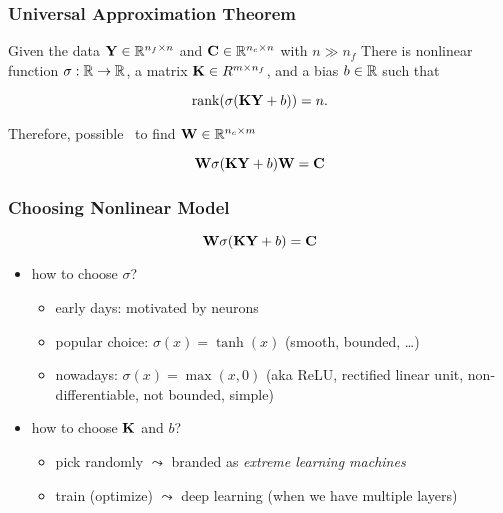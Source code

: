 \documentclass[12pt,fleqn,handout]{beamer}
\begin{document}
\begin{frame}[fragile]\frametitle{Universal Approximation Theorem}

Given the data ${\bf Y} \in \mathbb{R}^{n_f \times n}$ and ${\bf C} \in \mathbb{R}^{n_c \times n}$
with $n\gg n_f$
There is nonlinear function $\sigma:\mathbb{R} \to \mathbb{R}$, a matrix ${\bf K} \in R^{m \times n_f}$, and a bias $b \in \mathbb{R}$ such that

$$
 {\rm rank}(\sigma({\bf K} {\bf Y} + b)) = n.
$$

\bigskip
\pause
Therefore, possible~\cite{Cybenko1989,HornikEtAl1989} to find ${{\bf W}}\in\mathbb{R}^{n_c\times m}$

$${\bf W} \sigma( {\bf K} {\bf Y} +b) {{\bf W}}= {\bf C} $$

\end{frame}


\begin{frame}[fragile]\frametitle{Choosing Nonlinear Model}

$$ {\bf W}  \sigma({\bf K} {\bf Y}+b)= {\bf C} $$
\begin{itemize}
\item how to choose $\sigma$?
\pause
\begin{itemize}
	\item early days: motivated by neurons
	\item popular choice: $\sigma(x) = \tanh(x)$ (smooth, bounded, \ldots)
	\item nowadays: $\sigma(x) = \max(x,0)$ (aka ReLU, rectified linear unit, non-differentiable, not bounded, simple)
\end{itemize}
\pause
\item how to choose ${\bf K}$ and $b$?
\pause
\begin{itemize}
	\item pick randomly $\leadsto$ branded as \emph{extreme learning machines}~\cite{HuangEtAl2006}
	\item train (optimize) $\leadsto$ deep learning (when we have multiple layers)
\end{itemize}
\end{itemize}


\end{frame}
\end{document}
